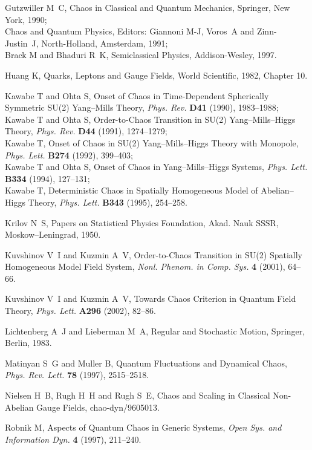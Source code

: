 \documentclass[a4paper,12pt]{article}
\begin{document}
\begin{thebibliography}{99}
Gutzwiller M~C, Chaos in Classical and Quantum Mechanics, Springer, New York, 1990;\\
Chaos and Quantum Physics, Editors: Giannoni M-J, Voros~A and Zinn-Justin~J,
North-Holland, Amsterdam, 1991;\\
Brack M and Bhaduri R~K, Semiclassical Physics, Addison-Wesley, 1997.

  Huang K,  Quarks, Leptons and Gauge Fields, World
                Scientific, 1982, Chapter 10.

 Kawabe T and Ohta S, Onset of Chaos in Time-Dependent Spherically
Symmetric SU(2) Yang--Mills Theory, {\it Phys. Rev.} {\bf D41} (1990), 1983--1988;\\
Kawabe T and Ohta S, Order-to-Chaos Transition in SU(2) Yang--Mills--Higgs Theory,
{\it
Phys. Rev.} {\bf D44} (1991), 1274--1279;\\
 Kawabe T, Onset of Chaos in SU(2) Yang--Mills--Higgs Theory with Monopole, {\it Phys.
Lett.} {\bf B274} (1992), 399--403;\\
 Kawabe T and Ohta S, Onset of Chaos in Yang--Mills--Higgs Systems, {\it Phys. Lett.}
{\bf B334} (1994), 127--131;\\
Kawabe T, Deterministic Chaos in Spatially Homogeneous Model of Abelian--Higgs Theory,
{\it Phys. Lett.} {\bf B343} (1995), 254--258.

 Krilov N~S, Papers on Statistical Physics Foundation, Akad. Nauk
SSSR, Moskow--Leningrad, 1950.

 Kuvshinov V~I and  Kuzmin A~V, Order-to-Chaos Transition in SU(2)
Spatially Homogeneous Model Field System, {\it Nonl. Phenom. in Comp. Sys.} {\bf 4}
(2001), 64--66.

 Kuvshinov V~I and  Kuzmin A~V, Towards Chaos Criterion in Quantum Field
Theory, {\it Phys. Lett.} {\bf A296} (2002), 82--86.

 Lichtenberg A~J and Lieberman M~A, Regular and Stochastic Motion,
Springer, Berlin, 1983.

 Matinyan S~G and Muller B, Quantum Fluctuations and Dynamical Chaos,
{\it Phys. Rev. Lett.} {\bf 78} (1997), 2515--2518.

 Nielsen H~B, Rugh H~H and Rugh S~E, Chaos and Scaling in Classical
Non-Abelian Gauge Fields, chao-dyn/9605013.

Robnik M, Aspects of Quantum Chaos in Generic Systems, {\it Open Sys. and Information
Dyn.} {\bf 4} (1997), 211--240.


\end{thebibliography}
\end{document}
